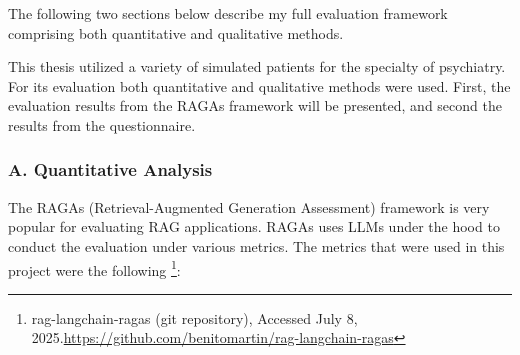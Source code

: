 The following two sections below describe my full evaluation framework comprising both quantitative and qualitative methods.

This thesis utilized a variety of simulated patients for the specialty of psychiatry. For its evaluation both quantitative and qualitative methods were used. First, the evaluation results from the RAGAs framework will be presented, and second the results from the questionnaire.

\subsubsection{A. Quantitative Analysis}
The RAGAs (Retrieval-Augmented Generation Assessment) framework is very popular for evaluating RAG applications. RAGAs uses LLMs under the hood to conduct the evaluation under various metrics. 
The metrics that were used in this project were the following \footnote{rag-langchain-ragas (git repository), Accessed July 8, 2025.\url{https://github.com/benitomartin/rag-langchain-ragas}}:

